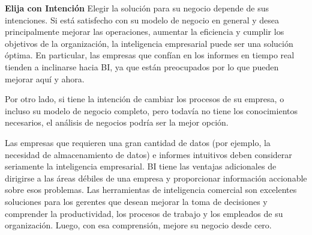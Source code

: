 \textbf{Elija con Intención} Elegir la solución para su negocio depende de sus intenciones. Si está satisfecho con su modelo de negocio en general y desea principalmente mejorar las operaciones, aumentar la eficiencia y cumplir los objetivos de la organización, la inteligencia empresarial puede ser una solución óptima. En particular, las empresas que confían en los informes en tiempo real tienden a inclinarse hacia 
BI, ya que están preocupados por lo que pueden mejorar aquí y ahora.

Por otro lado, si tiene la intención de cambiar los procesos de su empresa, o incluso su modelo de negocio completo, pero todavía no tiene los conocimientos necesarios, el análisis de negocios podría ser la mejor opción.

Las empresas que requieren una gran cantidad de datos (por ejemplo, la necesidad de almacenamiento de datos) e informes intuitivos deben considerar seriamente la inteligencia empresarial. BI tiene las ventajas adicionales de dirigirse a las áreas débiles de una empresa y proporcionar información accionable sobre esos problemas. Las herramientas de inteligencia comercial son excelentes soluciones para los gerentes que desean mejorar la toma de decisiones y comprender la productividad, los procesos de trabajo y los empleados de su organización. Luego, con esa comprensión, mejore su negocio desde cero.

